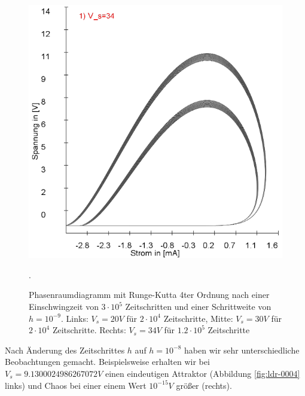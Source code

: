 \documentclass{scrartcl}
\begin{document}
\begin{figure}[!htbp]
\includegraphics[scale=0.28]{schwing-runge-nach300k-weitere120k-10-9-34V}
\caption{Phasenraumdiagramm mit Runge-Kutta 4ter Ordnung nach einer Einschwingzeit von  $3\cdot10^5$ Zeitschritten und einer Schrittweite von $h=10^{-9}$. Links: $V_s=20V$ für $2\cdot10^4$ Zeitschritte, Mitte: $V_s=30V$ für $2\cdot10^4$ Zeitschritte. Rechts: $V_s=34V$ für $1.2\cdot10^5$ Zeitschritte}. 
\label{fig:ldr-0003}
\end{figure}
\newline
Nach Änderung des Zeitschrittes $h$ auf $h=10^{-8}$ haben wir sehr unterschiedliche Beobachtungen gemacht. Beispielsweise erhalten wir bei $V_s=9.1300024986267072V$ einen eindeutigen Attraktor (Abbildung \ref{fig:ldr-0004} links) und Chaos bei einer einem Wert $10^{-15}V$ größer (rechts).
\end{document}
